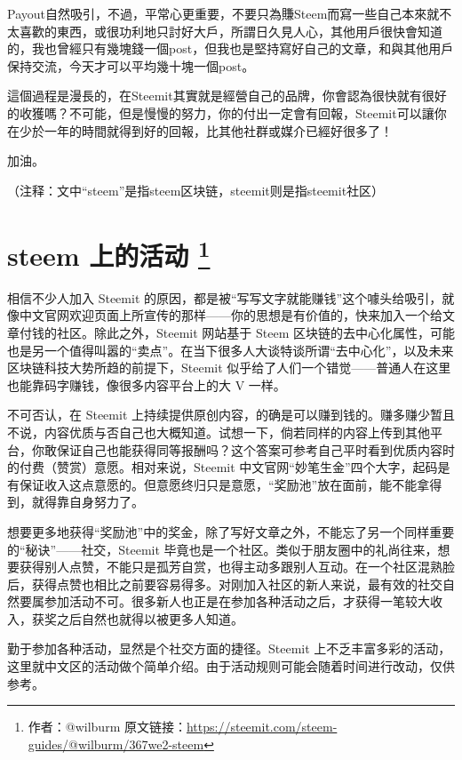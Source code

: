 \documentclass[]{ctexbook}
\begin{document}
Payout自然吸引，不過，平常心更重要，不要只為賺Steem而寫一些自己本來就不太喜歡的東西，或很功利地只討好大戶，所謂日久見人心，其他用戶很快會知道的，我也曾經只有幾塊錢一個post，但我也是堅持寫好自己的文章，和與其他用戶保持交流，今天才可以平均幾十塊一個post。

這個過程是漫長的，在Steemit其實就是經營自己的品牌，你會認為很快就有很好的收獲嗎？不可能，但是慢慢的努力，你的付出一定會有回報，Steemit可以讓你在少於一年的時間就得到好的回報，比其他社群或媒介已經好很多了！

加油。

（注释：文中``steem''是指steem区块链，steemit则是指steemit社区）

\hypertarget{steem-}{%
\section[steem 上的活动 ]{\texorpdfstring{steem 上的活动 \footnote{作者：@wilburm 原文链接：\url{https://steemit.com/steem-guides/@wilburm/367we2-steem}}}{steem 上的活动 }}\label{steem-}}

相信不少人加入 Steemit 的原因，都是被``写写文字就能赚钱''这个噱头给吸引，就像中文官网欢迎页面上所宣传的那样------你的思想是有价值的，快来加入一个给文章付钱的社区。除此之外，Steemit 网站基于 Steem 区块链的去中心化属性，可能也是另一个值得叫嚣的``卖点''。在当下很多人大谈特谈所谓``去中心化''，以及未来区块链科技大势所趋的前提下，Steemit 似乎给了人们一个错觉------普通人在这里也能靠码字赚钱，像很多内容平台上的大 V 一样。

不可否认，在 Steemit 上持续提供原创内容，的确是可以赚到钱的。赚多赚少暂且不说，内容优质与否自己也大概知道。试想一下，倘若同样的内容上传到其他平台，你敢保证自己也能获得同等报酬吗？这个答案可参考自己平时看到优质内容时的付费（赞赏）意愿。相对来说，Steemit 中文官网``妙笔生金''四个大字，起码是有保证收入这点意愿的。但意愿终归只是意愿，``奖励池''放在面前，能不能拿得到，就得靠自身努力了。

想要更多地获得``奖励池''中的奖金，除了写好文章之外，不能忘了另一个同样重要的``秘诀''------社交，Steemit 毕竟也是一个社区。类似于朋友圈中的礼尚往来，想要获得别人点赞，不能只是孤芳自赏，也得主动多跟别人互动。在一个社区混熟脸后，获得点赞也相比之前要容易得多。对刚加入社区的新人来说，最有效的社交自然要属参加活动不可。很多新人也正是在参加各种活动之后，才获得一笔较大收入，获奖之后自然也就得以被更多人知道。

勤于参加各种活动，显然是个社交方面的捷径。Steemit 上不乏丰富多彩的活动，这里就中文区的活动做个简单介绍。由于活动规则可能会随着时间进行改动，仅供参考。
\end{document}
